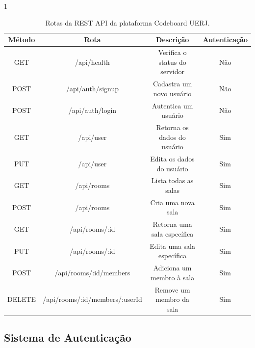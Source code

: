 \begin{table}[H]{1\textwidth}
    \centering
    \caption{Rotas da REST API da plataforma Codeboard UERJ.}
    \label{tab:rest-api-routes}
    \renewcommand{\arraystretch}{1.3} 
    \begin{tabular}{|c|c|c|c|}
        \hline
        \textbf{Método} & \textbf{Rota}                  & \textbf{Descrição}            & \textbf{Autenticação} \\
        \hline
        GET             & /api/health                    & Verifica o status do servidor & Não                   \\
        \hline
        POST            & /api/auth/signup               & Cadastra um novo usuário      & Não                   \\
        POST            & /api/auth/login                & Autentica um usuário          & Não                   \\
        \hline
        GET             & /api/user                      & Retorna os dados do usuário   & Sim                   \\
        PUT             & /api/user                      & Edita os dados do usuário     & Sim                   \\
        \hline
        GET             & /api/rooms                     & Lista todas as salas          & Sim                   \\
        POST            & /api/rooms                     & Cria uma nova sala            & Sim                   \\
        GET             & /api/rooms/:id                 & Retorna uma sala específica   & Sim                   \\
        PUT             & /api/rooms/:id                 & Edita uma sala específica     & Sim                   \\
        POST            & /api/rooms/:id/members         & Adiciona um membro à sala     & Sim                   \\
        DELETE          & /api/rooms/:id/members/:userId & Remove um membro da sala      & Sim                   \\
        \hline
    \end{tabular}
\end{table}


\subsection{Sistema de Autenticação}

